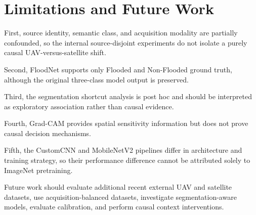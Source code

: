 \section{Limitations and Future Work}
\label{sec:limitations}

First, source identity, semantic class, and acquisition modality are
partially confounded, so the internal source-disjoint experiments do
not isolate a purely causal UAV-versus-satellite shift.

Second, FloodNet supports only Flooded and Non-Flooded ground truth,
although the original three-class model output is preserved.

Third, the segmentation shortcut analysis is post hoc and should be
interpreted as exploratory association rather than causal evidence.

Fourth, Grad-CAM provides spatial sensitivity information but does not
prove causal decision mechanisms.

Fifth, the CustomCNN and MobileNetV2 pipelines differ in architecture
and training strategy, so their performance difference cannot be
attributed solely to ImageNet pretraining.

Future work should evaluate additional recent external UAV and
satellite datasets, use acquisition-balanced datasets, investigate
segmentation-aware models, evaluate calibration, and perform causal
context interventions.
